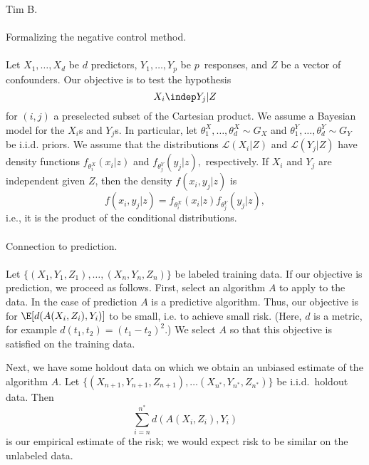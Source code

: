\documentclass[12pt]{article}
\begin{document}
\noindent
Tim B.
\\ \\
Formalizing the negative control method.
\\ \\
Let $X_1, \dots, X_d$ be $d$ predictors, $Y_1, \dots, Y_p$ be $p$ responses, and $Z$ be a vector of confounders. Our objective is to test the hypothesis $$ X_i \indep Y_j | Z$$ for $(i,j)$ a preselected subset of the Cartesian product. We assume a Bayesian model for the $X_i$s and $Y_j$s. In particular, let $\theta^X_1, \dots, \theta^X_d \sim G_X$ and $\theta^Y_1, \dots, \theta^Y_d \sim G_Y$ be i.i.d. priors. We assume that the distributions $\mathcal{L}(X_i|Z)$ and $\mathcal{L}(Y_j|Z)$ have density functions $f_{ \theta^X_i }(x_i | z) $ and $f_{\theta^Y_j}(y_j | z),$ respectively. If $X_i$ and $Y_j$ are independent given $Z$, then the density $f(x_i,y_j|z)$ is 
$$f(x_i,y_j|z) = f_{\theta^X_i}(x_i|z) f_{\theta^Y_j}(y_j|z),$$ i.e., it is the product of the conditional distributions.
\\ \\
Connection to prediction.
\\ \\
Let $\{ (X_1, Y_1, Z_1), \dots, (X_n, Y_n, Z_n) \}$ be labeled training data. If our objective is prediction, we proceed as follows. First, select an algorithm $A$ to apply to the data. In the case of prediction $A$ is a predictive algorithm. Thus, our objective is for $\E[d(A(X_i, Z_i), Y_i)]$ to be small, i.e. to achieve small risk. (Here, $d$ is a metric, for example $d(t_1, t_2) = (t_1 - t_2)^2$.) We select $A$ so that this objective is satisfied on the training data.

Next, we have some holdout data on which we obtain an unbiased estimate of the algorithm $A$. Let $\{(X_{n+1}, Y_{n+1}, Z_{n+1}), \dots (X_{n^*}, Y_{n^*}, Z_{n^*})\}$ be i.i.d.\ holdout data. Then
$$ \sum_{i=n}^{n^*} d(A( X_i, Z_i ), Y_i)$$ is our empirical estimate of the risk; we would expect risk to be similar on the unlabeled data.
\end{document}
